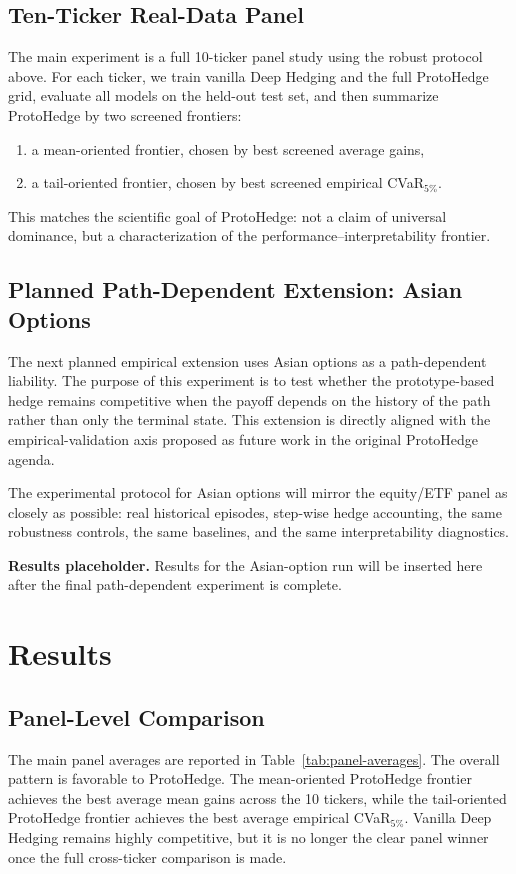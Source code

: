 \documentclass[11pt]{article}
\begin{document}
\subsection{Ten-Ticker Real-Data Panel}
The main experiment is a full 10-ticker panel study using the robust protocol above. For each ticker, we train vanilla Deep Hedging and the full ProtoHedge grid, evaluate all models on the held-out test set, and then summarize ProtoHedge by two screened frontiers:
\begin{enumerate}[leftmargin=1.5em]
    \item a mean-oriented frontier, chosen by best screened average gains,
    \item a tail-oriented frontier, chosen by best screened empirical CVaR$_{5\%}$.
\end{enumerate}
This matches the scientific goal of ProtoHedge: not a claim of universal dominance, but a characterization of the performance--interpretability frontier.

\subsection{Planned Path-Dependent Extension: Asian Options}
The next planned empirical extension uses Asian options as a path-dependent liability. The purpose of this experiment is to test whether the prototype-based hedge remains competitive when the payoff depends on the history of the path rather than only the terminal state. This extension is directly aligned with the empirical-validation axis proposed as future work in the original ProtoHedge agenda.

The experimental protocol for Asian options will mirror the equity/ETF panel as closely as possible: real historical episodes, step-wise hedge accounting, the same robustness controls, the same baselines, and the same interpretability diagnostics.

\textbf{Results placeholder.} Results for the Asian-option run will be inserted here after the final path-dependent experiment is complete.

\section{Results}

\subsection{Panel-Level Comparison}
The main panel averages are reported in Table~\ref{tab:panel-averages}. The overall pattern is favorable to ProtoHedge. The mean-oriented ProtoHedge frontier achieves the best average mean gains across the 10 tickers, while the tail-oriented ProtoHedge frontier achieves the best average empirical CVaR$_{5\%}$. Vanilla Deep Hedging remains highly competitive, but it is no longer the clear panel winner once the full cross-ticker comparison is made.
\end{document}

